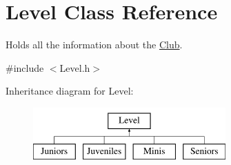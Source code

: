 \hypertarget{class_level}{}\section{Level Class Reference}
\label{class_level}


Holds all the information about the \hyperlink{class_club}{Club}.  




{\ttfamily \#include $<$Level.\+h$>$}

Inheritance diagram for Level\+:\begin{figure}[H]
\begin{center}
\leavevmode
\includegraphics[height=2.000000cm]{class_level}
\end{center}
\end{figure}
